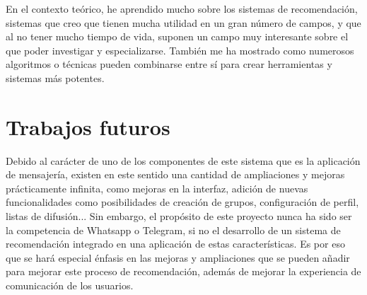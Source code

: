 En el contexto teórico, he aprendido mucho sobre los sistemas de recomendación, sistemas que creo que tienen mucha utilidad en un gran número de campos, y que al no tener mucho tiempo de vida, suponen un campo muy interesante sobre el que poder investigar y especializarse. También me ha mostrado como numerosos algoritmos o técnicas pueden combinarse entre sí para crear herramientas y sistemas más potentes.

\section{Trabajos futuros}

Debido al carácter de uno de los componentes de este sistema que es la aplicación de mensajería, existen en este sentido una cantidad de ampliaciones y mejoras prácticamente infinita, como mejoras en la interfaz, adición de nuevas funcionalidades como posibilidades de creación de grupos, configuración de perfil, listas de difusión... Sin embargo, el propósito de este proyecto nunca ha sido ser la competencia de Whatsapp o Telegram, si no el desarrollo de un sistema de recomendación integrado en una aplicación de estas características. Es por eso que se hará especial énfasis en las mejoras y ampliaciones que se pueden añadir para mejorar este proceso de recomendación, además de mejorar la experiencia de comunicación de los usuarios.


